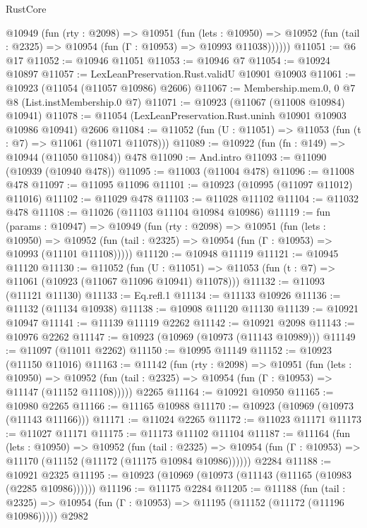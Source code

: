 \begin{lexlean}{RustCore}
\begin{coremodule}
      @10949
        (fun (rty : @2098) =>
        @10951
          (fun (lets : @10950) =>
          @10952 (fun (tail : @2325) => @10954 (fun (Γ : @10953) => @10993 @11038))))))
@11051 := @6 @17
@11052 := @10946 @11051
@11053 := @10946 @7
@11054 := @10924 @10897
@11057 := LexLeanPreservation.Rust.validU @10901 @10903
@11061 := @10923 (@11054 (@11057 @10986) @2606)
@11067 := Membership.mem.{0, 0} @7 @8 (List.instMembership.{0} @7)
@11071 := @10923 (@11067 (@11008 @10984) @10941)
@11078 := @11054 (LexLeanPreservation.Rust.uninh @10901 @10903 @10986 @10941) @2606
@11084 := @11052 (fun (U : @11051) => @11053 (fun (t : @7) => @11061 (@11071 @11078)))
@11089 := @10922 (fun (fn : @149) => @10944 (@11050 @11084)) @478
@11090 := And.intro
@11093 := @11090 (@10939 (@10940 @478))
@11095 := @11003 (@11004 @478)
@11096 := @11008 @478
@11097 := @11095 @11096
@11101 := @10923 (@10995 (@11097 @11012) @11016)
@11102 := @11029 @478
@11103 := @11028 @11102
@11104 := @11032 @478
@11108 := @11026 (@11103 @11104 @10984 @10986)
@11119 := fun (params : @10947) =>
  @10949
    (fun (rty : @2098) =>
    @10951
      (fun (lets : @10950) =>
      @10952 (fun (tail : @2325) => @10954 (fun (Γ : @10953) => @10993 (@11101 @11108)))))
@11120 := @10948 @11119
@11121 := @10945 @11120
@11130 := @11052
    (fun (U : @11051) => @11053 (fun (t : @7) => @11061 (@10923 (@11067 @11096 @10941) @11078)))
@11132 := @11093 (@11121 @11130)
@11133 := Eq.refl.{1}
@11134 := @11133 @10926
@11136 := @11132 (@11134 @10938)
@11138 := @10908 @11120 @11130
@11139 := @10921 @10947
@11141 := @11139 @11119 @2262
@11142 := @10921 @2098
@11143 := @10976 @2262
@11147 := @10923 (@10969 (@10973 (@11143 @10989)))
@11149 := @11097 (@11011 @2262)
@11150 := @10995 @11149
@11152 := @10923 (@11150 @11016)
@11163 := @11142
    (fun (rty : @2098) =>
    @10951
      (fun (lets : @10950) =>
      @10952 (fun (tail : @2325) => @10954 (fun (Γ : @10953) => @11147 (@11152 @11108)))))
    @2265
@11164 := @10921 @10950
@11165 := @10980 @2265
@11166 := @11165 @10988
@11170 := @10923 (@10969 (@10973 (@11143 @11166)))
@11171 := @11024 @2265
@11172 := @11023 @11171
@11173 := @11027 @11171
@11175 := @11173 @11102 @11104
@11187 := @11164
    (fun (lets : @10950) =>
    @10952
      (fun (tail : @2325) =>
      @10954 (fun (Γ : @10953) => @11170 (@11152 (@11172 (@11175 @10984 @10986))))))
    @2284
@11188 := @10921 @2325
@11195 := @10923 (@10969 (@10973 (@11143 (@11165 (@10983 (@2285 @10986))))))
@11196 := @11175 @2284
@11205 := @11188
    (fun (tail : @2325) => @10954 (fun (Γ : @10953) => @11195 (@11152 (@11172 (@11196 @10986)))))
    @2982

\end{coremodule}
\end{lexlean}
